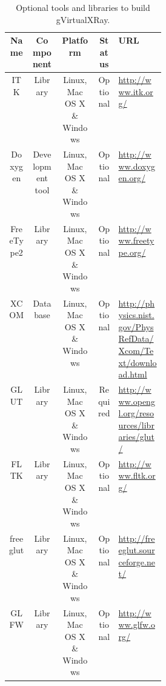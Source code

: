 \documentclass[11pt,oneside,a4paper,final]{article}
\begin{document}
% 
% 


\begin{table}[tbhp]
	\begin{center}
		\caption{\label{tab:optionalToolsAndLibraries} Optional tools and libraries to build gVirtualXRay.} 
		\begin{small}
			\begin{tabular}{|c|c|c|c|p{0.3\linewidth}|}
				\hline
				\textbf{Name} & \textbf{Component} & \textbf{Platform} & \textbf{Status} & \textbf{URL}\\
				\hline
				\hline
				\Acrshort{ITK} & Library & Linux, Mac OS X \& Windows & Optional & \url{http://www.itk.org/}\\
				\hline
				Doxygen & Development tool & Linux, Mac OS X \& Windows & Optional & \url{http://www.doxygen.org/}\\
				\hline
				FreeType2 & Library & Linux, Mac OS X \& Windows & Optional & \url{http://www.freetype.org/}\\
				\hline
				XCOM & Database & Linux, Mac OS X \& Windows & Optional & \url{http://physics.nist.gov/PhysRefData/Xcom/Text/download.html}\\
				\hline
				\Acrshort{GLUT} & Library & Linux, Mac OS X \& Windows & Required & \url{http://www.opengl.org/resources/libraries/glut/}\\
				\hline
				\Acrshort{FLTK} & Library & Linux, Mac OS X \& Windows & Optional & \url{http://www.fltk.org/}\\
				\hline
				freeglut & Library & Linux, Mac OS X \& Windows & Optional & \url{http://freeglut.sourceforge.net/}\\
				\hline
				GLFW & Library & Linux, Mac OS X \& Windows & Optional & \url{http://www.glfw.org/}\\
				\hline
			\end{tabular}
		\end{small}
	\end{center}
\end{table}
\end{document}
